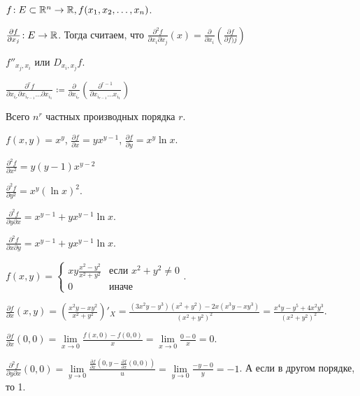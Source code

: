 \begin{definition}
    $f\!: E \subset \mathbb{R}^n \to \mathbb{R}, f(x_1, x_2, \ldots, x_n)$.

    $\frac{\partial f}{\partial x_j}\!: E \to \mathbb{R}$. Тогда считаем, что $\frac{\partial^2 f}{\partial x_i \partial x_j}(x) = \frac{\partial}{\partial x_i}\left(\frac{\partial f}{\partial f)j}\right)$
\end{definition}
\begin{definition}[Обозначения]
    $f''_{x_j, x_i}$ или  $D_{x_i, x_j}f$.    

    $\frac{\partial^r f}{\partial x_{i_r} \partial x_{i_{r-1}} \ldots \partial x_{i_1}} \coloneqq \frac{\partial}{\partial x_{i_r}} \left( \frac{\partial^{r-1}}{\partial x_{i_{r-1}} \ldots x_{i_1}}\right)$
\end{definition}
\begin{remark}
    Всего $n^r$ частных производных порядка $r$.
\end{remark}
\begin{example}
    $f(x, y) = x^y$,  $\frac{\partial f}{\partial x} = y x^{y-1}$, $\frac{\partial f}{\partial y} = x^y \ln x$.

    $\frac{\partial^2 f}{\partial x^2} = y(y-1)x^{y-2}$

    $\frac{\partial^2 f}{\partial y^2} = x^y (\ln x)^2$.

    $\frac{\partial^2 f}{\partial y \partial x} = x^{y-1} + y x^{y-1} \ln x$.

    $\frac{\partial^2 f}{\partial x \partial y} = x^{y-1} + y x^{y-1} \ln x$.
\end{example}
\begin{example}
    $f(x, y) = \begin{cases} xy \frac{x^2 - y^2}{x^2 + y^2} & \text{если } x^2 + y^2 \neq 0\\ 0 & \text{иначе} \end{cases}$.

    $\frac{\partial f}{\partial x}(x, y) = \left( \frac{x^2y - xy^2}{x^2+y^2}\right)'_X = \frac{(3x^2y-y^3)(x^2+y^2) - 2x(x^3y-xy^3)}{(x^2+y^2)^2} = \frac{x^4y-y^5+4x^2y^3}{(x^2+y^2)^2}$.

    $\frac{\partial f}{\partial x}(0, 0) = \lim\limits_{x \to 0} \frac{f(x, 0) - f(0, 0)}{x} = \lim\limits_{x \to 0} \frac{0 - 0}{x} = 0$.

    $\frac{\partial^2 f}{\partial y \partial x}(0, 0) = \lim\limits_{y \to 0} \frac{\frac{\partial f}{\partial x}(0, y - \frac{\partial f}{\partial x}(0, 0))}{u} = \lim\limits_{y \to 0}\frac{-y - 0}{y} = -1$. А если в другом порядке, то 1.
\end{example}
